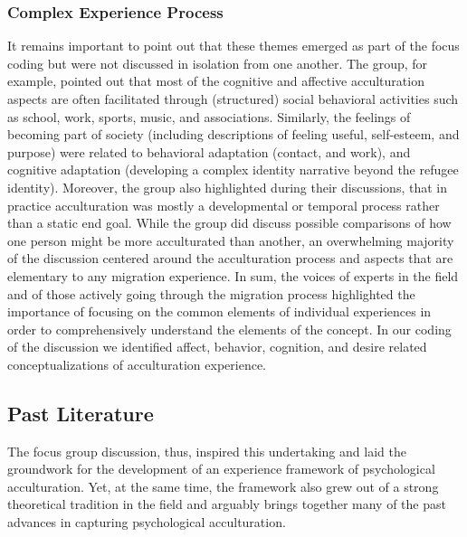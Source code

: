 \documentclass[man, 12pt, a4paper]{apa7}
\begin{document}
\subsubsection{Complex Experience Process}
It remains important to point out that these themes emerged as part of the focus coding but were not discussed in isolation from one another. The group, for example, pointed out that most of the cognitive and affective acculturation aspects are often facilitated through (structured) social behavioral activities such as school, work, sports, music, and associations. Similarly, the feelings of becoming part of society (including descriptions of feeling useful, self-esteem, and purpose) were related to behavioral adaptation (contact, and work), and cognitive adaptation (developing a complex identity narrative beyond the refugee identity). Moreover, the group also highlighted during their discussions, that in practice acculturation was mostly a developmental or temporal process rather than a static end goal. While the group did discuss possible comparisons of how one person might be more acculturated than another, an overwhelming majority of the discussion centered around the acculturation process and aspects that are elementary to any migration experience. In sum, the voices of experts in the field and of those actively going through the migration process highlighted the importance of focusing on the common elements of individual experiences in order to comprehensively understand the elements of the concept. In our coding of the discussion we identified affect, behavior, cognition, and desire related conceptualizations of acculturation experience.

\subsection{Past Literature}
The focus group discussion, thus, inspired this undertaking and laid the groundwork for the development of an experience framework of psychological acculturation. Yet, at the same time, the framework also grew out of a strong theoretical tradition in the field and arguably brings together many of the past advances in capturing psychological acculturation.
\end{document}
